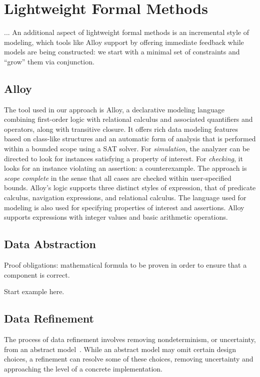 \section{Lightweight Formal Methods}

...
An additional aspect of lightweight formal methods is an incremental style of modeling, which tools like Alloy support by offering immediate feedback while models are being constructed: we start with a minimal set of constraints and ``grow'' them via conjunction.

\subsection{Alloy}

The tool used in our approach is Alloy, a declarative modeling language combining first-order logic with relational calculus and associated quantifiers and operators, along with transitive closure.  It offers rich data modeling features based on class-like structures and an automatic form of analysis that is performed within a bounded scope using a SAT solver.  For \emph{simulation}, the analyzer can be directed to look for instances satisfying a property of interest.  For \emph{checking}, it looks for an instance violating an assertion: a counterexample.  The approach is \emph{scope complete} in the sense that all cases are checked within user-specified bounds.  Alloy's logic supports three distinct styles of expression, that of predicate calculus, navigation expressions, and relational calculus.  The language used for modeling is also used for specifying properties of interest and assertions.  Alloy supports expressions with integer values and basic arithmetic operations.

\subsection{Data Abstraction}

Proof obligations: mathematical formula to be proven in order to ensure that a component is correct.

Start example here.

\subsection{Data Refinement}

The process of data refinement involves removing nondeterminism, or uncertainty, from an abstract model~\cite{woodcock1996}.  While an abstract model may omit certain design choices, a refinement can resolve some of these choices, removing uncertainty and approaching the level of a concrete implementation.

